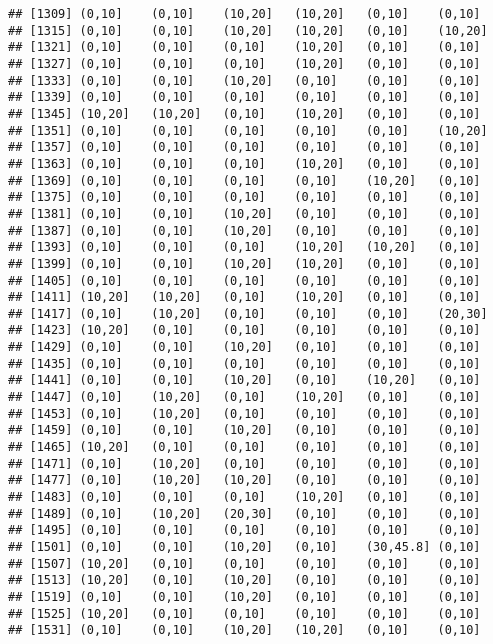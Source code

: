 \documentclass[]{article}
\begin{document}
\begin{verbatim}
## [1309] (0,10]    (0,10]    (10,20]   (10,20]   (0,10]    (0,10]   
## [1315] (0,10]    (0,10]    (10,20]   (10,20]   (0,10]    (10,20]  
## [1321] (0,10]    (0,10]    (0,10]    (10,20]   (0,10]    (0,10]   
## [1327] (0,10]    (0,10]    (0,10]    (10,20]   (0,10]    (0,10]   
## [1333] (0,10]    (0,10]    (10,20]   (0,10]    (0,10]    (0,10]   
## [1339] (0,10]    (0,10]    (0,10]    (0,10]    (0,10]    (0,10]   
## [1345] (10,20]   (10,20]   (0,10]    (10,20]   (0,10]    (0,10]   
## [1351] (0,10]    (0,10]    (0,10]    (0,10]    (0,10]    (10,20]  
## [1357] (0,10]    (0,10]    (0,10]    (0,10]    (0,10]    (0,10]   
## [1363] (0,10]    (0,10]    (0,10]    (10,20]   (0,10]    (0,10]   
## [1369] (0,10]    (0,10]    (0,10]    (0,10]    (10,20]   (0,10]   
## [1375] (0,10]    (0,10]    (0,10]    (0,10]    (0,10]    (0,10]   
## [1381] (0,10]    (0,10]    (10,20]   (0,10]    (0,10]    (0,10]   
## [1387] (0,10]    (0,10]    (10,20]   (0,10]    (0,10]    (0,10]   
## [1393] (0,10]    (0,10]    (0,10]    (10,20]   (10,20]   (0,10]   
## [1399] (0,10]    (0,10]    (10,20]   (10,20]   (0,10]    (0,10]   
## [1405] (0,10]    (0,10]    (0,10]    (0,10]    (0,10]    (0,10]   
## [1411] (10,20]   (10,20]   (0,10]    (10,20]   (0,10]    (0,10]   
## [1417] (0,10]    (10,20]   (0,10]    (0,10]    (0,10]    (20,30]  
## [1423] (10,20]   (0,10]    (0,10]    (0,10]    (0,10]    (0,10]   
## [1429] (0,10]    (0,10]    (10,20]   (0,10]    (0,10]    (0,10]   
## [1435] (0,10]    (0,10]    (0,10]    (0,10]    (0,10]    (0,10]   
## [1441] (0,10]    (0,10]    (10,20]   (0,10]    (10,20]   (0,10]   
## [1447] (0,10]    (10,20]   (0,10]    (10,20]   (0,10]    (0,10]   
## [1453] (0,10]    (10,20]   (0,10]    (0,10]    (0,10]    (0,10]   
## [1459] (0,10]    (0,10]    (10,20]   (0,10]    (0,10]    (0,10]   
## [1465] (10,20]   (0,10]    (0,10]    (0,10]    (0,10]    (0,10]   
## [1471] (0,10]    (10,20]   (0,10]    (0,10]    (0,10]    (0,10]   
## [1477] (0,10]    (10,20]   (10,20]   (0,10]    (0,10]    (0,10]   
## [1483] (0,10]    (0,10]    (0,10]    (10,20]   (0,10]    (0,10]   
## [1489] (0,10]    (10,20]   (20,30]   (0,10]    (0,10]    (0,10]   
## [1495] (0,10]    (0,10]    (0,10]    (0,10]    (0,10]    (0,10]   
## [1501] (0,10]    (0,10]    (10,20]   (0,10]    (30,45.8] (0,10]   
## [1507] (10,20]   (0,10]    (0,10]    (0,10]    (0,10]    (0,10]   
## [1513] (10,20]   (0,10]    (10,20]   (0,10]    (0,10]    (0,10]   
## [1519] (0,10]    (0,10]    (10,20]   (0,10]    (0,10]    (0,10]   
## [1525] (10,20]   (0,10]    (0,10]    (0,10]    (0,10]    (0,10]   
## [1531] (0,10]    (0,10]    (10,20]   (10,20]   (0,10]    (0,10]   

\end{verbatim}
\end{document}
